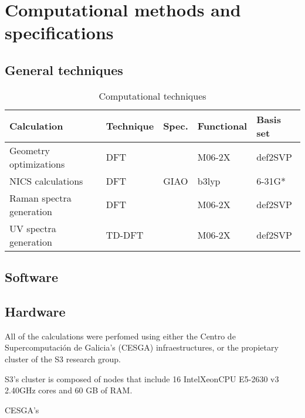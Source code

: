 \chapter{Computational methods and specifications}


\section{General techniques}



\begin{table*}[h]
    \centering
    \caption{Computational techniques}
    \label{tab:computational_techinques}
    \begin{tabular}{@{}lllll@{}}
        \toprule
        Calculation & Technique & Spec. & Functional & Basis set \\
        \midrule
        Geometry optimizations & DFT & & M06-2X & def2SVP \\
        NICS calculations & DFT & GIAO & b3lyp & 6-31G* \\
        Raman spectra generation & DFT & & M06-2X & def2SVP \\
        UV spectra generation & TD-DFT & & M06-2X & def2SVP \\
        \bottomrule
    \end{tabular}
\end{table*}

\blindtext[4]


\section{Software}

\blindtext[2]


\section{Hardware}
All of the calculations were perfomed using either the Centro de Supercomputación de Galicia's (CESGA) infraestructures, or the propietary cluster of the S3 research group.

S3's cluster is composed of nodes that include 16 Intel\textregistered Xeon\textregistered CPU E5-2630 v3 2.40GHz cores and 60 GB of RAM.

CESGA's
